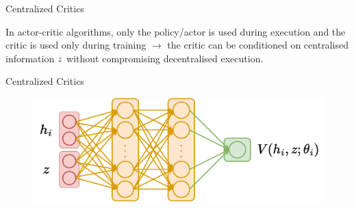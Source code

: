 \begin{frame}[t]{Centralized Critics}
    \begin{notebox}
        In actor-critic algorithms, only the policy/actor is used during execution and the critic is used only during training $\rightarrow$ the critic can be conditioned on centralised information $z$ without compromising decentralised execution.
    \end{notebox}

\end{frame}

\begin{frame}[t]{Centralized Critics}
    \begin{figure}[t]
        \centering
        \includegraphics[width=.8\linewidth]{images/chapter_9/v_architecture.pdf}
    \end{figure}

\end{frame}

